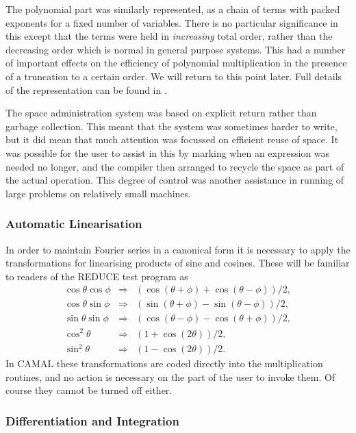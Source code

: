 The polynomial part was similarly represented, as a chain of terms
with packed exponents for a fixed number of variables.  There is no
particular significance in this except that the terms were held in
\emph{increasing} total order, rather than the decreasing order which
is normal in general purpose systems.  This had a number of important
effects on the efficiency of polynomial multiplication in the presence
of a truncation to a certain order.  We will return to this point
later.  Full details of the representation can be found in
\cite{Fitch:LN75}.

The space administration system was based on explicit return rather
than garbage collection.  This meant that the system was sometimes
harder to write, but it did mean that much attention was focussed on
efficient reuse of space.  It was possible for the user to assist in
this by marking when an expression was needed no longer, and the
compiler then arranged to recycle the space as part of the actual
operation.  This degree of control was another assistance in running
of large problems on relatively small machines.

\subsubsection{Automatic Linearisation}

In order to maintain Fourier series in a canonical form it is
necessary to apply the transformations for linearising products of
sine and cosines.  These will be familiar to readers of the REDUCE
test program as
\begin{eqnarray}
\cos \theta \cos \phi & \Rightarrow &
                (\cos(\theta+\phi)+\cos(\theta-\phi))/2, \\
\cos \theta \sin \phi & \Rightarrow &
                (\sin(\theta+\phi)-\sin(\theta-\phi))/2, \\
\sin \theta \sin \phi & \Rightarrow &
                (\cos(\theta-\phi)-\cos(\theta+\phi))/2, \\
\cos^2 \theta & \Rightarrow & (1+\cos(2\theta))/2,      \\
\sin^2 \theta & \Rightarrow & (1-\cos(2\theta))/2.
\end{eqnarray}
In CAMAL these transformations are coded directly into the
multiplication routines, and no action is necessary on the part of the
user to invoke them.  Of course they cannot be turned off either.

\subsubsection{Differentiation and Integration}

